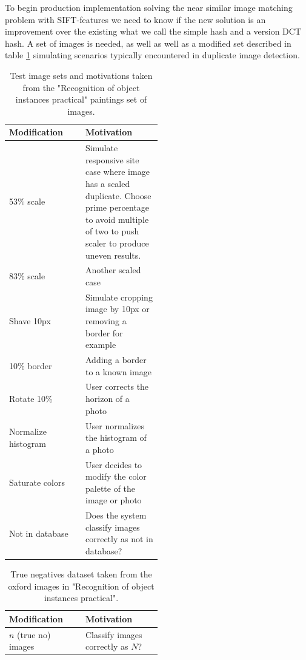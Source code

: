 \documentclass[english,12pt,a4paper,pdftex,elec,utf8]{aaltothesis}
\begin{document}
To begin production implementation solving the near similar image matching problem with SIFT-features we need to know if the new solution is an improvement over the existing what we call the simple hash and a version DCT hash. A set of images is needed, as well as well as a modified set described in table \ref{modifiedimages} simulating scenarios typically encountered in duplicate image detection.

\def\arraystretch{1.5}
\begin{table}[htb]
\caption{Test image sets and motivations taken from the "Recognition of object instances practical" paintings set of images.}
\label{modifiedimages}
\begin{center}
\begin{tabular}{lp{0.5\linewidth}}
  Modification & Motivation \\
  \hline \hline
  53\% scale& Simulate responsive site case where image has a scaled duplicate. Choose prime percentage to avoid multiple of two to push scaler to produce uneven results.\\
  \hline
  83\% scale& Another scaled case \\
  \hline
  Shave 10px & Simulate cropping image by 10px or removing a border for example\\
  \hline
  10\% border & Adding a border to a known image \\
  \hline
  Rotate 10\% & User corrects the horizon of a photo \\
  \hline
  Normalize histogram & User normalizes the histogram of a photo\\
  \hline
  Saturate colors & User decides to modify the color palette of the image or photo\\
  \hline
  Not in database & Does the system classify images correctly as not in database?\\
\end{tabular}
\end{center}\end{table}

\def\arraystretch{1.5}
\begin{table}[htb]
\caption{True negatives dataset taken from the oxford images in "Recognition of object instances practical".}
\label{truenegatives}
\begin{center}
\begin{tabular}{lp{0.5\linewidth}}
  Modification & Motivation \\
  \hline \hline
  $n$ (true no) images  & Classify images correctly as $N$?\\
\end{tabular}
\end{center}\end{table}
\end{document}
